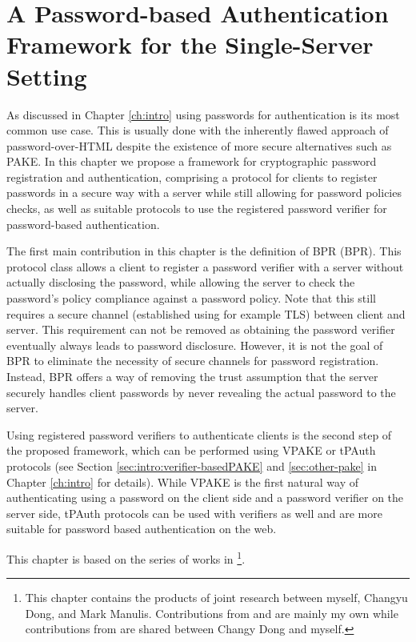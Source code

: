\chapter[A Password Authentication Framework for the Single-Server Setting]{A Password-based Authentication Framework for the Single-Server Setting} \label{ch:vpake}

As discussed in Chapter \ref{ch:intro} using passwords for authentication is its most common use case. 
This is usually done with the inherently flawed approach of password-over-\ac{HTML} despite the existence of more secure alternatives such as \ac{PAKE}.
In this chapter we propose a framework for cryptographic password registration and authentication, comprising a protocol for clients to register passwords in a secure way with a server while still allowing for password policies checks, as well as suitable protocols to use the registered password verifier for password-based authentication.

The first main contribution in this chapter is the definition of \acl{BPR} (\ac{BPR}).
This protocol class allows a client to register a password verifier with a server without actually disclosing the password, while allowing the server to check the password's policy compliance against a password policy.
Note that this still requires a secure channel (established using for example \ac{TLS}) between client and server.
This requirement can not be removed as obtaining the password verifier eventually always leads to password disclosure.
However, it is not the goal of \ac{BPR} to eliminate the necessity of secure channels for password registration.
Instead, \ac{BPR} offers a way of removing the trust assumption that the server securely handles client passwords by never revealing the actual password to the server.

Using registered password verifiers to authenticate clients is the second step of the proposed framework, which can be performed using \ac{VPAKE} or \ac{tPAuth} protocols (see Section \ref{sec:intro:verifier-basedPAKE} and \ref{sec:other-pake} in Chapter \ref{ch:intro} for details).
While \ac{VPAKE} is the first natural way of authenticating using a password on the client side and a password verifier on the server side, \ac{tPAuth} protocols can be used with verifiers as well and are more suitable for password based authentication on the web.
 
\smallskip
\noindent
This chapter is based on the series of works in \cite{KieferM14b,KieferM15a,DongK15a}\footnote{This chapter contains the products of joint research between myself, Changyu Dong, and Mark Manulis. Contributions from \cite{KieferM14b} and \cite{KieferM15a} are mainly my own while contributions from \cite{DongK15a} are shared between Changy Dong and myself.}.
 
